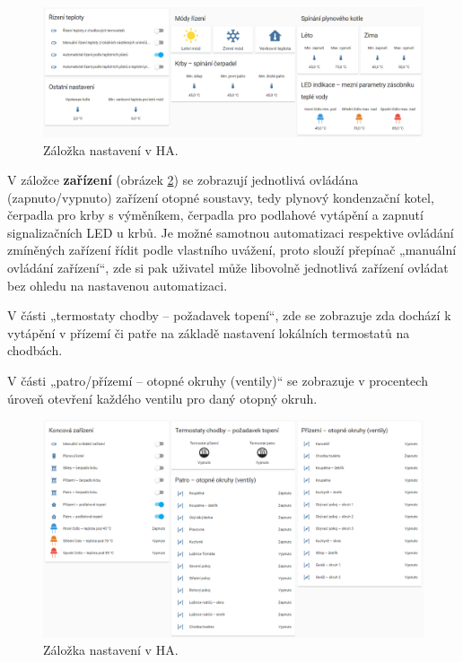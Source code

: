 \begin{figure}[H]
    \centering
    \includegraphics[width=\textwidth]{images/software-ha/zalozka-nastaveni.png}
    \caption{Záložka nastavení v HA.}
    \label{fig:zalozka-nastaveni}
\end{figure}

V záložce \textbf{zařízení} (obrázek \ref{fig:zalozka-zarizeni}) se zobrazují jednotlivá ovládána (zapnuto/vypnuto) zařízení otopné soustavy, tedy plynový kondenzační kotel, čerpadla pro krby s výměníkem, čerpadla pro podlahové vytápění a zapnutí signalizačních LED u krbů. Je možné samotnou automatizaci respektive ovládání zmíněných zařízení řídit podle vlastního uvážení, proto slouží přepínač „manuální ovládání zařízení“, zde si pak uživatel může libovolně jednotlivá zařízení ovládat bez ohledu na nastavenou automatizaci.

V části „termostaty chodby – požadavek topení“, zde se zobrazuje zda dochází k vytápění v přízemí či patře na základě nastavení lokálních termostatů na chodbách.

V části „patro/přízemí – otopné okruhy (ventily)“ se zobrazuje v procentech úroveň otevření každého ventilu pro daný otopný okruh.

\begin{figure}[H]
    \centering
    \includegraphics[width=\textwidth]{images/software-ha/zalozka-zarizeni.png}
    \caption{Záložka nastavení v HA.}
    \label{fig:zalozka-zarizeni}
\end{figure}

